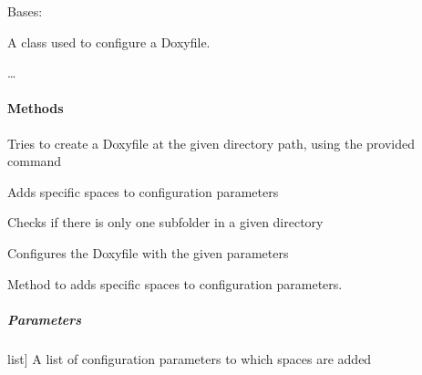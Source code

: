 \documentclass[letterpaper,10pt,english]{sphinxmanual}
\begin{document}
\begin{fulllineitems}
\label{\detokenize{main.doxygen_management:main.doxygen_management.doxyfile_configurator.DoxyfileConfigurator}}
\pysigstartsignatures
{}
\pysigstopsignatures
\sphinxAtStartPar
Bases: 

\sphinxAtStartPar
A class used to configure a Doxyfile.

\sphinxAtStartPar
…


\paragraph{Methods}
\label{\detokenize{main.doxygen_management:id7}}\begin{description}
\sphinxAtStartPar
Tries to create a Doxyfile at the given directory path, using the provided command

\sphinxAtStartPar
Adds specific spaces to configuration parameters

\sphinxAtStartPar
Checks if there is only one subfolder in a given directory

\sphinxAtStartPar
Configures the Doxyfile with the given parameters

\end{description}

\begin{fulllineitems}
\label{\detokenize{main.doxygen_management:main.doxygen_management.doxyfile_configurator.DoxyfileConfigurator.add_spaces_to_string}}
\pysigstartsignatures
{}
\pysigstopsignatures
\sphinxAtStartPar
Method to adds specific spaces to configuration parameters.


\subparagraph{Parameters}
\label{\detokenize{main.doxygen_management:id8}}\begin{description}
\sphinxlineitem{config\_parameters}{[}list{]}
\sphinxAtStartPar
A list of configuration parameters to which spaces are added


\end{description}
\end{fulllineitems}
\end{fulllineitems}
\end{document}
